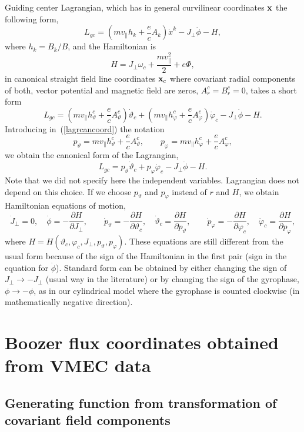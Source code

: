 \documentclass[12pt]{article}
\newcommand{\be}[1]{\begin{equation} \label{#1}}
\newcommand{\ee}{\end{equation}}
\newcommand{\eq}[1]{(\ref{#1})}
\newcommand{\difp}[2]{\frac{\partial #1}{\partial #2}}
\newcommand{\bx}{{\bf x}}
\begin{document}
Guiding center Lagrangian, which has in general curvilinear coordinates $\bx$ the following form,
\be{lagrgencoord}
L_{gc} = \left(mv_\parallel h_k+\frac{e}{c}A_k\right)\dot x^k-J_\perp\dot\phi-H,
\ee
where $h_k = B_k /B$, and the Hamiltonian is
\be{gcham}
H=J_\perp\omega_c+\frac{mv_\parallel^2}{2}+e\Phi,
\ee
in canonical straight field line coordinates $\bx_c$ where covariant radial components of both, vector potential
and magnetic field are zeros, $A_r^c=B_r^c=0$, takes a short form
\be{lagrcancoord}
L_{gc} = 
\left(mv_\parallel h_\vartheta^c+\frac{e}{c}A_\vartheta^c\right)\dot \vartheta_c
+
\left(mv_\parallel h_\varphi^c+\frac{e}{c}A_\varphi^c\right)\dot \varphi_c
-
J_\perp\dot\phi-H.
\ee
\noindent
Introducing in~\eq{lagrcancoord} the notation
\be{canmomenta}
p_\vartheta=mv_\parallel h_\vartheta^c+\frac{e}{c}A_\vartheta^c,
\qquad
p_\varphi=mv_\parallel h_\varphi^c+\frac{e}{c}A_\varphi^c,
\ee
we obtain the canonical form of the Lagrangian,
\be{Lagr_can}
L_{gc}=p_\vartheta\dot\vartheta_c+p_\varphi\dot\varphi_c- J_\perp\dot\phi-H.
\ee
Note that we did not specify here the independent variables. Lagrangian does 
not depend on this choice. If we choose $p_\vartheta$ and $p_\varphi$ instead
of $r$ and $H$, we obtain Hamiltonian equations of motion,
\be{hameqs}
\dot J_\perp = 0, \quad \dot\phi=-\difp{H}{J_\perp},
\qquad
\dot p_\vartheta = - \difp{H}{\vartheta_c}, \quad 
\dot \vartheta_c = \difp{H}{p_\vartheta},
\qquad
\dot p_\varphi = - \difp{H}{\varphi_c}, \quad 
\dot \varphi_c = \difp{H}{p_\varphi},
\ee
where $H=H(\vartheta_c,\varphi_c,J_\perp,p_\vartheta,p_\varphi)$. These equations
are still different from the usual form because of the sign of the Hamiltonian
in the first pair (sign in the equation for $\dot\phi$). Standard form can be 
obtained by either changing the sign of $J_\perp\rightarrow -J_\perp$ 
(usual way in the literature) or by changing the sign of the gyrophase,
$\phi\rightarrow-\phi$, as in our cylindrical model where the gyrophase is
counted clockwise (in mathematically negative direction).

\section{Boozer flux coordinates obtained from VMEC data}

\subsection{Generating function from transformation of covariant field components}
\label{ssec:covartrans}
\end{document}

